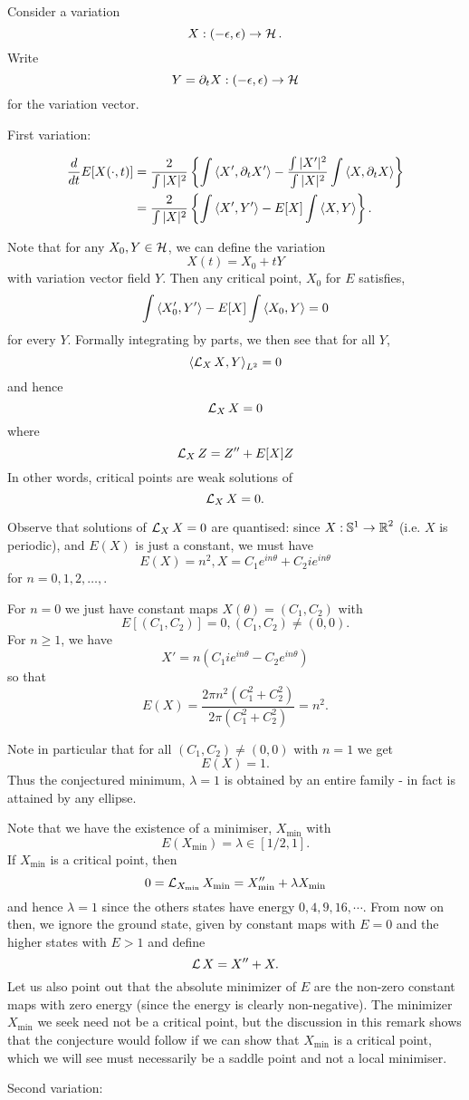 \documentclass[12pt]{article}
\begin{document}
Consider a variation
\[
X : (-\epsilon, \epsilon) \to \operatorname{\mathcal{H}}.
\]
Write
\[
Y = \partial_t X : (-\epsilon, \epsilon) \to \operatorname{\mathcal{H}}
\]
for the variation vector.

First variation:

\begin{align*}
\dfrac{d}{dt} E[X(\cdot,t)] &= \frac{2}{\int |X|^2} \left\lbrace \int \left\langle{X'},{\partial_t X'}\right\rangle - \frac{\int |X'|^2}{\int |X|^2} \int \left\langle{X},{\partial_t X}\right\rangle \right\rbrace \\
&=  \frac{2}{\int|X|^2} \left\lbrace \int \left\langle{X'},{Y'}\right\rangle - E[X] \int \left\langle{X},{Y}\right\rangle\right\rbrace.
\end{align*}

Note that for any $X_0, Y \in \operatorname{\mathcal{H}}$, we can define the variation
\[
X(t) = X_0 + t Y
\]
with variation vector field \(Y\). Then any critical point, \(X_0\) for \(E\) satisfies,
\[
\int \left\langle{X_0'},{Y'}\right\rangle - E[X] \int \left\langle{X_0},{Y}\right\rangle = 0
\]
for every \(Y\). Formally integrating by parts, we then see that for all \(Y\),
\[
\left\langle{\operatorname{\mathcal{L}}_X X},{Y}\right\rangle_{L^2} = 0
\]
and hence
\[
\operatorname{\mathcal{L}}_X X = 0
\]
where
\[
\operatorname{\mathcal{L}}_X Z = Z'' + E[X] Z 
\]
In other words, critical points are weak solutions of
\[
\operatorname{\mathcal{L}}_X X = 0.
\]

Observe that solutions of \(\operatorname{\mathcal{L}}_X X = 0\) are quantised: since \(X : \operatorname{\mathbb{S}^1} \to \operatorname{\mathbb{R}}^2\) (i.e. \(X\) is periodic), and \(E(X)\) is just a constant, we must have
\[
E(X) = n^2, X = C_1 e^{in\theta} + C_2 i e^{in\theta}
\]
for \(n = 0, 1, 2, \dots,\).

For \(n = 0\) we just have constant maps \(X(\theta) = (C_1, C_2)\) with
\[
E[(C_1, C_2)] = 0, (C_1, C_2) \ne (0, 0).
\]
For \(n \geq 1\), we have
\[
X' = n \left(C_1 i e^{in\theta} - C_2 e^{in\theta}\right)
\]
so that
\[
E(X) = \frac{2\pi n^2 (C_1^2 + C_2^2)}{2\pi (C_1^2 + C_2^2)} = n^2.
\]

Note in particular that for all \((C_1, C_2) \ne (0, 0)\) with \(n = 1\) we get
\[
E(X) = 1.
\]
Thus the conjectured minimum, \(\lambda = 1\) is obtained by an entire family - in fact is attained by any ellipse.

\begin{rem}
Note that we have the existence of a minimiser, \(X_{\min}\) with
\[
E(X_{\min}) = \lambda \in [1/2, 1].
\]
If \(X_{\min}\) is a critical point, then
\[
0 = \operatorname{\mathcal{L}}_{X_{\min}} X_{\min} = X_{\min}'' + \lambda X_{\min}
\]
and hence \(\lambda = 1\) since the others states have energy \(0, 4, 9, 16, \cdots\). From now on then, we ignore the ground state, given by constant maps with \(E = 0\) and the higher states with \(E > 1\) and define
\[
\operatorname{\mathcal{L}} X = X'' + X.
\]
Let us also point out that the absolute minimizer of \(E\) are the non-zero constant maps with zero energy (since the energy is clearly non-negative). The minimizer \(X_{\min}\) we seek need not be a critical point, but the discussion in this remark shows that the conjecture would follow if we can show that \(X_{\min}\) is a critical point, which we will see must necessarily be a saddle point and not a local minimiser.
\end{rem}
Second variation:
\end{document}
